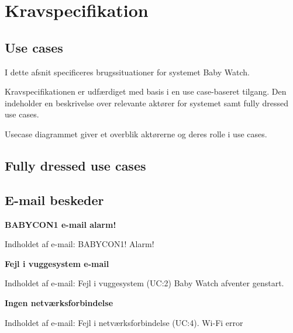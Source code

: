 \chapter{Kravspecifikation}


\newpage
\section{Use cases}

I dette afsnit specificeres brugssituationer for systemet Baby Watch.

Kravspecifikationen er udfærdiget med basis i en use case-baseret tilgang. Den indeholder en beskrivelse over relevante aktører for systemet samt fully dressed use cases.


Usecase diagrammet giver et overblik aktørerne og deres rolle i use cases.


\newpage
\section{Fully dressed use cases}

\newpage

\newpage

\newpage




\section{E-mail beskeder}

\textbf{BABYCON1 e-mail alarm!} \newline

Indholdet af e-mail: BABYCON1! Alarm!  \newline

\textbf{Fejl i vuggesystem e-mail} \newline

Indholdet af e-mail: Fejl i vuggesystem (UC:2) Baby Watch afventer genstart. \newline

\textbf{Ingen netværksforbindelse} \newline

Indholdet af e-mail: Fejl i netværksforbindelse (UC:4). Wi-Fi error \newline


